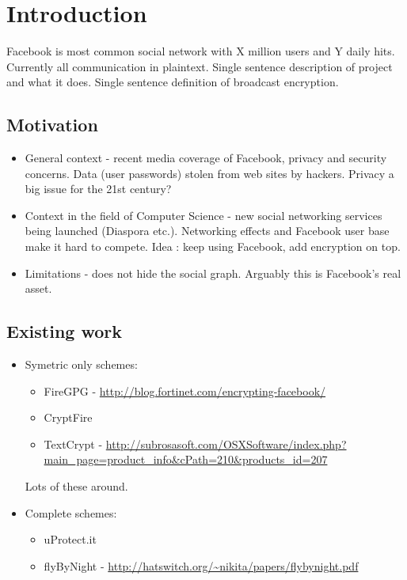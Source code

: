 \chapter{Introduction}\label{ch:introduction}

Facebook is most common social network with X million users and Y daily hits. Currently all communication in plaintext. Single sentence description of project and what it does. Single sentence definition of broadcast encryption.

\section{Motivation}

\begin{itemize}

    \item General context - recent media coverage of Facebook, privacy and security concerns. Data (user passwords) stolen from web sites by hackers. Privacy a big issue for the 21st century?
    
    \item Context in the field of Computer Science - new social networking services being launched (Diaspora etc.). Networking effects and Facebook user base make it hard to compete. Idea : keep using Facebook, add encryption on top.
    
    \item Limitations - does not hide the social graph. Arguably this is Facebook's real asset.

\end{itemize}


\section{Existing work}
\begin{itemize}
    \item Symetric only schemes:
    
    \begin{itemize}
        \item FireGPG - \url{http://blog.fortinet.com/encrypting-facebook/}
        \item CryptFire
        \item TextCrypt - \url{http://subrosasoft.com/OSXSoftware/index.php?main_page=product_info&cPath=210&products_id=207}
    \end{itemize}
    
    Lots of these around.
    
    \item Complete schemes:
    
    \begin{itemize}
        \item uProtect.it
        \item flyByNight - \url{http://hatswitch.org/~nikita/papers/flybynight.pdf}
    \end{itemize}
\end{itemize}




